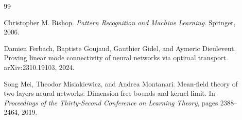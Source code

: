 \documentclass[11pt]{article}
\theoremstyle{definition}
\begin{document}
\begin{thebibliography}{99}

Christopher M. Bishop.
\newblock \emph{Pattern Recognition and Machine Learning}.
\newblock Springer, 2006.

Damien Ferbach, Baptiste Goujaud, Gauthier Gidel, and Aymeric Dieuleveut.
\newblock Proving linear mode connectivity of neural networks via optimal
transport.
\newblock arXiv:2310.19103, 2024.

Song Mei, Theodor Misiakiewicz, and Andrea Montanari.
\newblock Mean-field theory of two-layers neural networks: Dimension-free
bounds and kernel limit.
\newblock In \emph{Proceedings of the Thirty-Second Conference on Learning
Theory}, pages 2388--2464, 2019.

\end{thebibliography}
\end{document}
